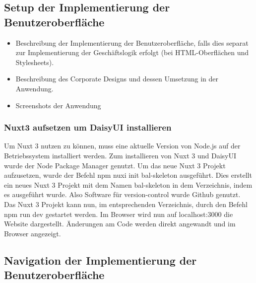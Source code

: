 \subsection{Setup der Implementierung der Benutzeroberfläche}
\label{sec:Setup der ImplementierungBenutzeroberflaeche}

\begin{itemize}
	\item Beschreibung der Implementierung der Benutzeroberfläche, falls dies separat zur Implementierung der Geschäftslogik erfolgt (\zB bei \acs{HTML}-Oberflächen und Stylesheets).
	\item \Ggfs Beschreibung des Corporate Designs und dessen Umsetzung in der Anwendung.
	\item Screenshots der Anwendung
\end{itemize}

\subsubsection{Nuxt3 aufsetzen um DaisyUI installieren}
\label{sec:Nuxt3 aufsetzen um DaisyUI installieren}
Um Nuxt 3 nutzen zu können, muss eine aktuelle Version von Node.js auf der Betriebssystem installiert werden. Zum installieren von Nuxt 3 und DaisyUI wurde der Node Package Manager genutzt. Um das neue Nuxt 3 Projekt aufzusetzen, wurde der Befehl npm nuxi init bal-skeleton ausgeführt. Dies erstellt ein neues Nuxt 3 Projekt mit dem Namen bal-skeleton in dem Verzeichnis, indem es ausgeführt wurde. Also Software für version-control wurde Github genutzt. Das Nuxt 3 Projekt kann nun, im entsprechenden Verzeichnis, durch den Befehl npm run dev gestartet werden. Im Browser wird nun auf localhost:3000 die Website dargestellt. Änderungen am Code werden direkt angewandt und im Browser angezeigt.

\subsection{Navigation der Implementierung der Benutzeroberfläche}
\label{sec:Navigation der der ImplementierungBenutzeroberflaeche}

